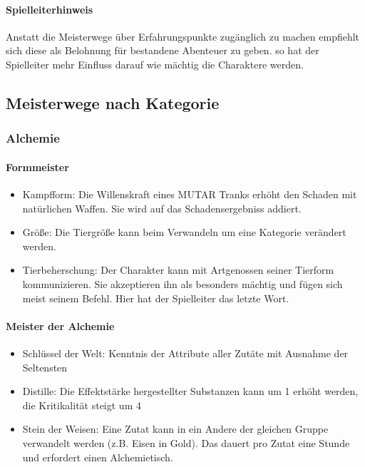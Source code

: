 \documentclass{article}
\begin{document}
\begin{mdframed}[hidealllines=true, backgroundcolor=black!10]
\paragraph{Spielleiterhinweis}

Anstatt die Meisterwege über Erfahrungspunkte zugänglich zu machen empfiehlt sich diese als Belohnung für bestandene
Abenteuer zu geben. so hat der Spielleiter mehr Einfluss darauf wie mächtig die Charaktere werden.

\end{mdframed}
\begin{center}
\subsection{Meisterwege nach Kategorie}
\end{center}

\subsubsection{Alchemie}

\paragraph{Formmeister}

\begin{itemize}
\item Kampfform: Die Willenskraft eines MUTAR Tranks erhöht den Schaden mit natürlichen Waffen. Sie wird auf das Schadensergebniss addiert.
\item Größe: Die Tiergröße kann beim Verwandeln um eine Kategorie verändert werden.
\item Tierbeherschung: Der Charakter kann mit Artgenossen seiner Tierform kommunizieren. Sie akzeptieren ihn als besonders mächtig und fügen sich meist seinem Befehl. Hier hat der Spielleiter das letzte Wort.
\end{itemize}

\paragraph{Meister der Alchemie}

\begin{itemize}
\item Schlüssel der Welt: Kenntnis der Attribute aller Zutäte mit Ausnahme der Seltensten
\item Distille: Die Effektstärke hergestellter Substanzen kann um 1 erhöht werden, die Kritikalität steigt um 4
\item Stein der Weisen: Eine Zutat kann in ein Andere der gleichen Gruppe verwandelt werden (z.B. Eisen in Gold). Das dauert pro Zutat eine Stunde und erfordert einen Alchemietisch.
\end{itemize}
\end{document}
